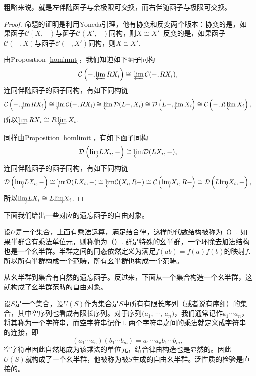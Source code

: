 粗略来说，就是左伴随函子与余极限可交换，而右伴随函子与极限可交换。

\begin{proof}
	命题的证明是利用Yoneda引理，他有协变和反变两个版本：协变的是，如果函子$\mathcal{C}(X,-)$与函子$\mathcal{C}(X',-)$同构，则$X\cong X'$. 反变的是，如果函子$\mathcal{C}(-,X)$与函子$\mathcal{C}(-,X')$同构，则$X\cong X'$.

	由Proposition \ref{homlimit}，我们知道如下函子同构
	\[
	\mathcal{C}\left(-,{\varprojlim}\, RX_i\right)\cong \,{\varprojlim}\, \mathcal{C}(-,RX_i),
	\]
	连同伴随函子的函子同构，有如下同构链
	\[
	\mathcal{C}\left(-,{\varprojlim}\, RX_i\right)\cong {\varprojlim}\, \mathcal{C}(-,RX_i)\cong {\varprojlim}\, \mathcal{D}(L-,X_i)\cong \mathcal{D}\left(L-,{\varprojlim}\,X_i\right)\cong \mathcal{C}\left(-,R\,{\varprojlim}\, X_i\right),
	\]
	所以${\varprojlim}\, RX_i\cong R\,{\varprojlim}\, X_i$.

	同样由Proposition \ref{homlimit}，有如下函子同构
	\[
	\mathcal{D}\left({\varinjlim} LX_i,-\right)\cong {\varprojlim} \mathcal{D}(LX_i,-),
	\]
	连同伴随函子的函子同构，有如下同构链
	\[
	\mathcal{D}\left({\varinjlim} LX_i,-\right)\cong {\varprojlim} \mathcal{D}(LX_i,-)\cong {\varprojlim} \mathcal{C}(X_i,R-)\cong \mathcal{C}\left({\varinjlim} X_i,R-\right)\cong \mathcal{D}\left(L{\varinjlim} X_i,-\right),
	\]
	所以${\varinjlim} LX_i\cong L{\varinjlim} X_i$.
\end{proof}

下面我们给出一些对应的遗忘函子的自由对象。

\begin{para}
设$U$是一个集合，上面有乘法运算，满足结合律，这样的代数结构被称为（）. 如果半群含有乘法单位元，则称他为（）. 群是特殊的幺半群，一个环除去加法结构也是一个幺半群。半群之间的同态依然定义为满足$f(ab)=f(a)f(b)$的映射$f$. 所以所有半群构成一个范畴，所有幺半群也构成一个范畴。

从幺半群到集合有自然的遗忘函子。反过来，下面从一个集合构造一个幺半群，这就构成了幺半群范畴的自由对象。

设$S$是一个集合，设$U(S)$作为集合是$S$中所有有限长序列（或者说有序组）的集合，其中空序列也看成有限长序列。对于序列$(a_1$, $\cdots$, $a_n)$，我们通常记作$a_1\cdots a_n$，将其称为一个字符串，而空字符串记作$1$. 两个字符串之间的乘法就定义成字符串的连接，即
\[
	(a_1\cdots a_n)(b_1\cdots b_m)=a_1\cdots a_nb_1\cdots b_m,
\]
空字符串因此自然地成为该乘法的单位元，结合律由构造也是显然的。因此$U(S)$就构成了一个幺半群，他被称为被$S$生成的自由幺半群。泛性质的检验是直接的。
\end{para}

